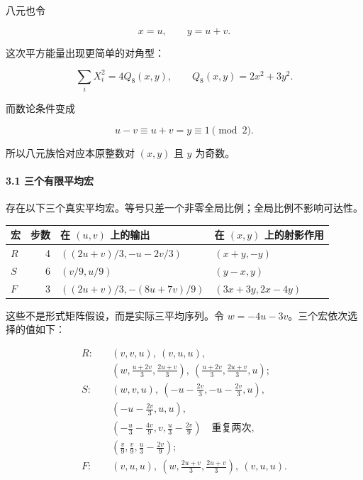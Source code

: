 \documentclass[11pt,a4paper]{article}
\theoremstyle{definition}
\numberwithin{equation}{section}
\begin{document}
{八元也令}

\[
x=u,\qquad y=u+v.
\]

{这次平方能量出现更简单的对角型：}

\[
\sum_iX_i^2=4Q_8(x,y),\qquad
Q_8(x,y)=2x^2+3y^2.
\]

{而数论条件变成}

\[
u-v\equiv u+v=y\equiv1\pmod2.
\]

{所以八元族恰对应本原整数对} \((x,y)\) {且} \(y\) {为奇数。}

\paragraph*{\texorpdfstring{{3.1} {三个有限平均宏}}{3.1 三个有限平均宏}}\label{C34-h227}

{存在以下三个真实平均宏。等号只差一个非零全局比例；全局比例不影响可达性。}

{ %
\begin{longtable}[]{@{}lrll@{}}
\toprule\noalign{}
{宏} & {步数} & {在} \((u,v)\) {上的输出} & {在} \((x,y)\) {上的射影作用} \\
\midrule\noalign{}
\endhead
\bottomrule\noalign{}
\endlastfoot
\(R\) & {4} & \(((2u+v)/3,-u-2v/3)\) & \((x+y,-y)\) \\
\(S\) & {6} & \((v/9,u/9)\) & \((y-x,y)\) \\
\(F\) & {3} & \(((2u+v)/3,-(8u+7v)/9)\) & \((3x+3y,2x-4y)\) \\
\end{longtable}
}

{这些不是形式矩阵假设，而是实际三平均序列。令} \(w=-4u-3v\){。三个宏依次选择的值如下：}

\[
\begin{aligned}
R:\quad &(v,v,u),\ (v,u,u),\\
&\left(w,\frac{u+2v}{3},\frac{2u+v}{3}\right),\
\left(\frac{u+2v}{3},\frac{2u+v}{3},u\right);\\[3pt]
S:\quad &(w,v,u),\ \left(-u-\frac{2v}{3},-u-\frac{2v}{3},u\right),\\
&\left(-u-\frac{2v}{3},u,u\right),\\
&\left(-\frac u3-\frac{4v}{9},v,\frac u3-\frac{2v}{9}\right)
\quad\text{重复两次},\\
&\left(\frac v9,\frac v9,\frac u3-\frac{2v}{9}\right);\\[3pt]
F:\quad &(v,u,u),\
\left(w,\frac{2u+v}{3},\frac{2u+v}{3}\right),\
(v,u,u).
\end{aligned}
\]
\end{document}
